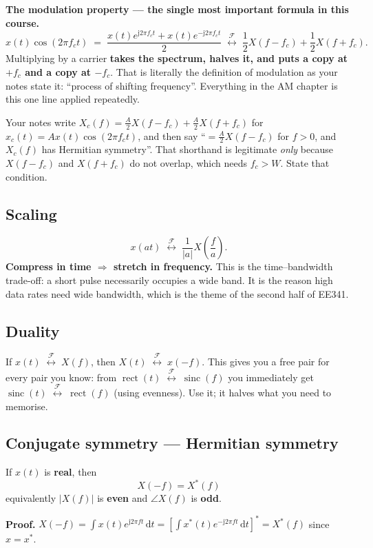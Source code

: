 \documentclass[11pt,a4paper]{article}
\newcommand{\FT}{\;\stackrel{\mathcal{F}}{\longleftrightarrow}\;}
\newcommand{\sinc}{\operatorname{sinc}}
\newcommand{\rect}{\operatorname{rect}}
\newcommand{\dd}{\,\mathrm{d}}
\newcommand{\ii}{\mathrm{j}}
\begin{document}
\begin{keybox}
\textbf{The modulation property --- the single most important formula in this course.}
\[
x(t)\cos(2\pi f_ct)\;=\;\frac{x(t)e^{\ii2\pi f_ct}+x(t)e^{-\ii2\pi f_ct}}{2}
\FT
\frac{1}{2}X(f-f_c)+\frac{1}{2}X(f+f_c).
\]
Multiplying by a carrier \textbf{takes the spectrum, halves it, and puts a copy at $+f_c$ and a copy at
$-f_c$}. That is literally the definition of modulation as your notes state it: ``process of shifting
frequency''. Everything in the AM chapter is this one line applied repeatedly.
\end{keybox}

Your notes write $X_c(f)=\frac{A}{2}X(f-f_c)+\frac{A}{2}X(f+f_c)$ for $x_c(t)=Ax(t)\cos(2\pi f_ct)$, and then
say ``$=\frac{A}{2}X(f-f_c)$ for $f>0$, and $X_c(f)$ has Hermitian symmetry''. That shorthand is legitimate
\emph{only} because $X(f-f_c)$ and $X(f+f_c)$ do not overlap, which needs $f_c>W$. State that condition.

\subsection{Scaling}
\[
x(at)\FT\frac{1}{|a|}X\!\left(\frac fa\right).
\]
\textbf{Compress in time $\Rightarrow$ stretch in frequency.} This is the time--bandwidth trade-off: a short
pulse necessarily occupies a wide band. It is the reason high data rates need wide bandwidth, which is the
theme of the second half of EE341.

\subsection{Duality}
If $x(t)\FT X(f)$, then $X(t)\FT x(-f)$. This gives you a free pair for every pair you know:
from $\rect(t)\FT\sinc(f)$ you immediately get $\sinc(t)\FT\rect(f)$ (using evenness). Use it; it halves
what you need to memorise.

\subsection{Conjugate symmetry --- Hermitian symmetry}
\begin{keybox}
If $x(t)$ is \textbf{real}, then
\[
\boxed{X(-f)=X^*(f)}
\]
equivalently $|X(f)|$ is \textbf{even} and $\angle X(f)$ is \textbf{odd}.
\end{keybox}
\textbf{Proof.} $X(-f)=\int x(t)e^{\ii2\pi ft}\dd t = \left[\int x^*(t)e^{-\ii2\pi ft}\dd t\right]^*=X^*(f)$
since $x=x^*$.
\end{document}
